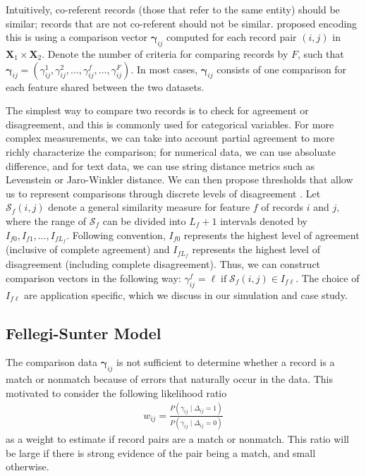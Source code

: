 \documentclass[12pt,letterpaper]{article}
\newcommand{\1}[1]{\mathbb{I}\!\left[#1\right]} %
\begin{document}
Intuitively, co-referent records (those that refer to the same entity) should be similar; records that are not co-referent should not be similar. \cite{fellegi_theory_1969} proposed encoding this is using a comparison vector $\bm{\gamma}_{ij}$ computed for each record pair $(i,j)$ in $\bm{X}_1 \times \bm{X}_2.$ Denote the number of criteria for comparing records by $F$, such that 
$\bm{\gamma}_{ij} = (\gamma_{ij}^1, \gamma_{ij}^2, \ldots, \gamma_{ij}^f, \ldots, \gamma_{ij}^F).$ In most cases, $\bm{\gamma}_{ij}$ consists of one comparison for each feature shared between the two datasets. 

The simplest way to compare two records is to check for agreement or disagreement, and this is commonly used for categorical variables. For more complex measurements, we can take into account partial agreement to more richly characterize the comparison; for numerical data, we can use absoluate difference, and for text data, we can use string distance metrics such as Levenstein or Jaro-Winkler distance. We can then propose thresholds that allow us to represent comparisons through discrete levels of disagreement \citep{bilenko2006riddle, elmagarmid_duplicate_2007}. Let $\mathcal{S}_f(i,j)$ denote a general similarity measure for feature $f$ of records $i$ and $j,$ where the range of $\mathcal{S}_f$ can be divided into $L_f +1$ intervals denoted by $I_{f0}, I_{f1}, \ldots, I_{fL_f}$. Following convention, $I_{f0}$ represents the highest level of agreement (inclusive of complete agreement) and $I_{fL_f}$ represents the highest level of disagreement (including complete disagreement). Thus, we can construct comparison vectors in the following way: 
$\gamma_{ij}^f = \ell \; \text{if} \; \mathcal{S}_f(i,j) \in I_{f\ell}.$
The choice of $I_{f\ell}$ are application specific, which we discuss in our simulation and case study. 


\subsection{Fellegi-Sunter Model}
\label{fellegi-sunter}
The comparison data $\bm{\gamma}_{ij}$ is not sufficient to determine whether a record is a match or nonmatch because of errors that naturally occur in the data. This motivated \cite{fellegi_theory_1969} to consider the following likelihood ratio
\begin{align}
	\label{eqn:wts}
	w_{ij} = \frac{P(\gamma_{ij} \mid \Delta_{ij} = 1)}{P(\gamma_{ij} \mid \Delta_{ij} = 0)}
\end{align}
as a weight to estimate if record pairs are a match or nonmatch. This ratio will be large if there is strong evidence of the pair being a match, and small otherwise. 
\end{document}
